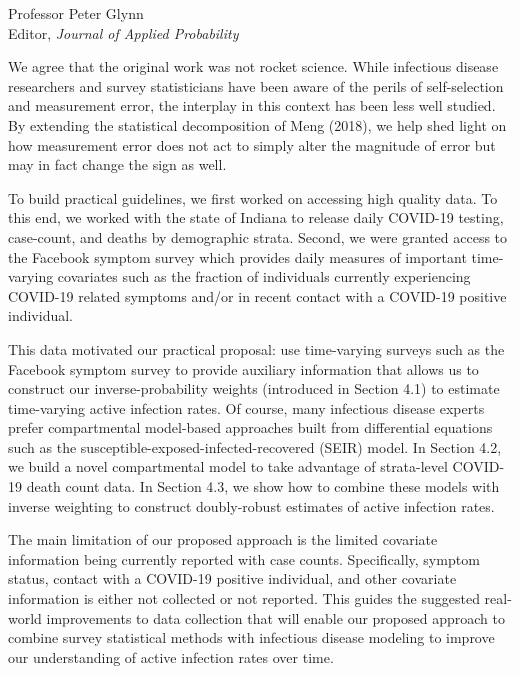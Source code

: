 \documentclass[11pt]{letter} %
\begin{document}
\begin{letter}{Professor
	Peter Glynn\\
	Editor, {\em Journal of Applied Probability}}
\begin{itemize}
\vspace{5mm}

\vspace{5mm}
We agree that the original work was not rocket science. While infectious disease researchers and survey statisticians have been aware of the perils of self-selection and measurement error, the interplay in this context has been less well studied.  By extending the statistical decomposition of Meng (2018), we help shed light on how measurement error does not act to simply alter the magnitude of error but may in fact change the sign as well.
\vspace{5mm}

To build practical guidelines, we first worked on accessing high quality data.
To this end, we worked with the state of Indiana to release daily COVID-19 testing, case-count, and deaths by demographic strata. Second, we were granted access to the Facebook symptom survey which provides daily measures of important time-varying covariates such as the fraction of individuals currently experiencing COVID-19 related symptoms and/or in recent contact with a COVID-19 positive individual.
\vspace{5mm}

This data motivated our practical proposal: use time-varying surveys such as the Facebook symptom survey to provide auxiliary information that allows us to construct our inverse-probability weights (introduced in Section 4.1) to estimate time-varying active infection rates. Of course, many infectious disease experts prefer compartmental model-based approaches built from differential equations such as the susceptible-exposed-infected-recovered (SEIR) model.  In Section 4.2, we build a novel compartmental model to take advantage of strata-level COVID-19 death count data.  In Section 4.3, we show how to combine these models with inverse weighting to construct doubly-robust estimates of active infection rates.
\vspace{5mm}

The main limitation of our proposed approach is the limited covariate information being currently reported with case counts.  Specifically, symptom status, contact with a COVID-19 positive individual, and other covariate information is either not collected or not reported.  This guides the suggested real-world improvements to data collection that will enable our proposed approach to combine survey statistical methods with infectious disease modeling to improve our understanding of active infection rates over time.
\vspace{5mm}



\end{itemize}
\end{letter}
\end{document}
